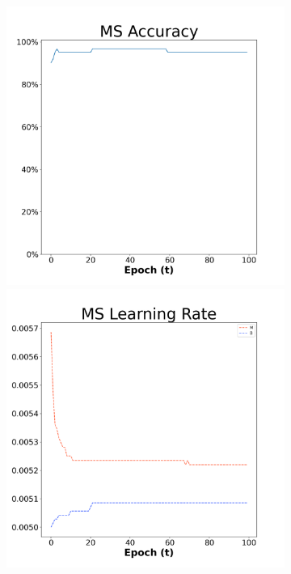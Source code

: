 \begin{figure}[H]
    \centering %
\begin{subfigure}{0.3\textwidth}
  \includegraphics[width=\linewidth]{images/exper1/breast/MS_0.01_acc.png}
    \includegraphics[width=\linewidth]{images/exper1/breast/MS_0.01_lr.png}

\end{subfigure}
\end{figure}
